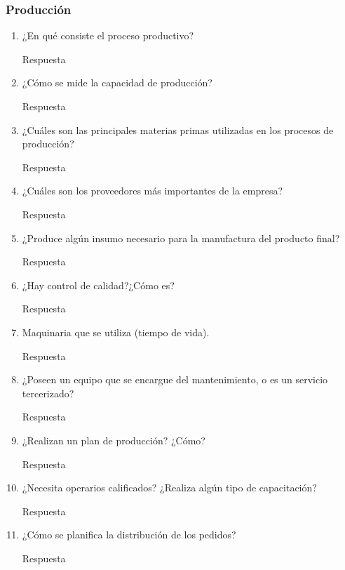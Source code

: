 \documentclass[a4paper,10pt]{article}
\begin{document}
			

		\subsubsection{Producción}
			\begin{enumerate}[resume]
				\item ¿En qué consiste el proceso productivo?
				
				Respuesta
				
				\item ¿Cómo se mide la capacidad de producción?
				
				Respuesta
				
				\item ¿Cuáles son las principales materias primas utilizadas en los procesos de producción?
				
				Respuesta
				
				\item ¿Cuáles son los proveedores más importantes de la empresa?
				
				Respuesta
				
				\item ¿Produce algún insumo necesario para la manufactura del producto final?
				
				Respuesta
				
				\item ¿Hay control de calidad?¿Cómo es? 
								
				Respuesta
				
				\item Maquinaria que se utiliza (tiempo de vida).
				
				Respuesta
				
				\item ¿Poseen un equipo que se encargue del mantenimiento, o es un servicio tercerizado?
				
				Respuesta
				
				\item ¿Realizan un plan de producción? ¿Cómo?
				
				Respuesta
				
				\item ¿Necesita operarios calificados? ¿Realiza algún tipo de capacitación?
				
				Respuesta
				
				\item ¿Cómo se planifica la distribución de los pedidos?
				
				Respuesta
				
				
			
			\end{enumerate}
			
\end{document}
